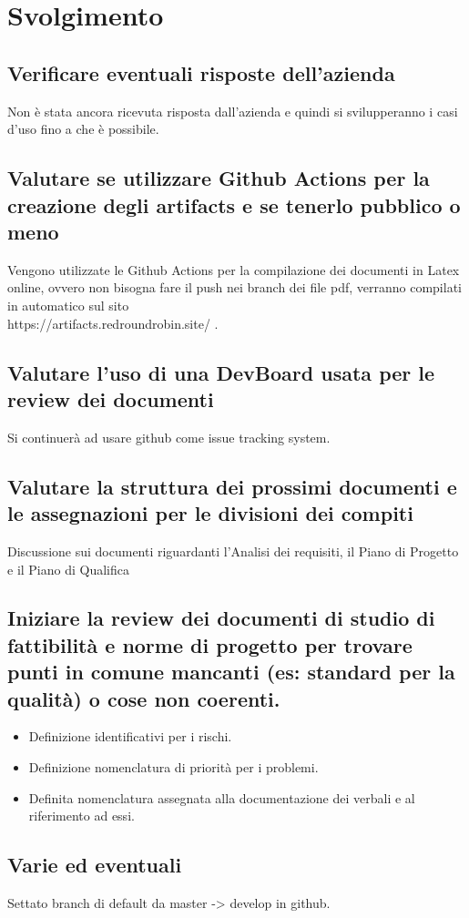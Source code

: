 \newpage
\section*{Svolgimento}

	\subsection*{Verificare eventuali risposte dell'azienda}
		Non è stata ancora ricevuta risposta dall'azienda e quindi si svilupperanno i casi d'uso fino a che è possibile.
	\subsection*{Valutare se utilizzare Github Actions per la creazione degli artifacts e se tenerlo pubblico o meno}
		Vengono utilizzate le Github Actions per la compilazione dei documenti in Latex online, ovvero non bisogna fare il push nei branch dei file pdf, verranno compilati in automatico sul sito \\ https://artifacts.redroundrobin.site/ .
	\subsection*{Valutare l'uso di una DevBoard usata per le review dei documenti}
		Si continuerà ad usare github come issue tracking system.
	\subsection*{Valutare la struttura dei prossimi documenti e le assegnazioni per le divisioni dei compiti}
		Discussione sui documenti riguardanti l'Analisi dei requisiti, il Piano di Progetto e il Piano di Qualifica
	\subsection*{Iniziare la review dei documenti di studio di fattibilità e norme di progetto per trovare punti in comune mancanti (es: standard per la qualità) o cose non coerenti.}
		\begin{itemize}
			\item Definizione identificativi per i rischi.
			\item Definizione nomenclatura di priorità per i problemi.
			\item Definita nomenclatura assegnata alla documentazione dei verbali e al riferimento ad essi.
		\end{itemize}
	\subsection*{Varie ed eventuali}
		Settato branch di default da master -> develop in github.
